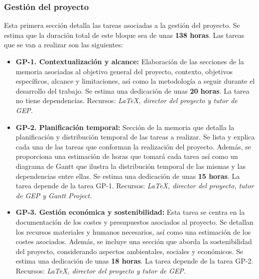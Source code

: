 \subsubsection{Gestión del proyecto}
Esta primera sección detalla las tareas asociadas a la gestión del proyecto.
Se estima que la duración total de este bloque sea de unas \textbf{138 horas}. Las tareas que se van a realizar son las siguientes:
\begin{itemize}
    \item \textbf{GP-1. Contextualización y alcance:} Elaboración de las secciones de la memoria asociadas 
    al objetivo general del proyecto, contexto, objetivos específicos, alcance y limitaciones, así como la metodología 
    a seguir durante el desarrollo del trabajo. Se estima una dedicación de unas \textbf{20 horas}.
    \newline La tarea no tiene dependencias.
    \newline Recursos: \textit {LaTeX, director del proyecto y tutor de GEP.}
    
    \item \textbf{GP-2. Planificación temporal:} Sección de la memoria que detalla la planificación y distribución temporal
    de las tareas a realizar. Se lista y explica cada una de las tareas que conforman la realización del proyecto. Además, se 
    proporciona una estimación de horas que tomará cada tarea así como un diagrama de Gantt que ilustra la distribución 
    temporal de las mismas y las dependencias entre ellas. Se estima una dedicación de unas \textbf{15 horas}. 
    \newline La tarea depende de la tarea GP-1.
    \newline Recursos: \textit {LaTeX, director del proyecto, tutor de GEP y Gantt Project.}
    
    \item \textbf{GP-3. Gestión económica y sostenibilidad:} Esta tarea se centra en la documentación de los costes y presupuestos 
    asociados al proyecto. Se detallan los recursos materiales y humanos necesarios, así como una estimación de los costes 
    asociados. Además, se incluye una sección que aborda la sostenibilidad del proyecto, considerando aspectos ambientales, 
    sociales y económicos. Se estima una dedicación de unas \textbf{18 horas}. 
    \newline La tarea depende de la tarea GP-2.
    \newline Recursos: \textit {LaTeX, director del proyecto y tutor de GEP.}
    

\end{itemize}

